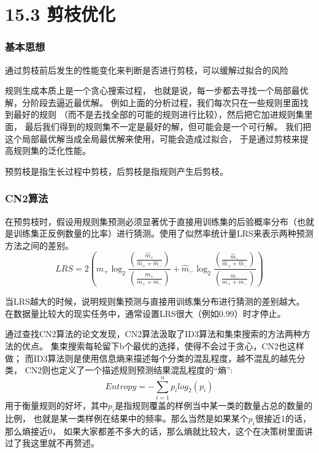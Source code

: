 \documentclass[UTF8]{article}
\begin{document}
\section{15.3 剪枝优化}
\subsubsection{基本思想}
    通过剪枝前后发生的性能变化来判断是否进行剪枝，可以缓解过拟合的风险
    
    规则生成本质上是一个贪心搜索过程，
    也就是说，每一步都去寻找一个局部最优解，分阶段去逼近最优解。
    例如上面的分析过程，我们每次只在一些规则里面找到最好的规则
    （而不是去找全部的可能的规则进行比较），然后把它加进规则集里面，
    最后我们得到的规则集不一定是最好的解，但可能会是一个可行解。
    我们把这个局部最优解当成全局最优解来使用，可能会造成过拟合，
    于是通过剪枝来提高规则集的泛化性能。

    预剪枝是指生长过程中剪枝，后剪枝是指规则产生后剪枝。
\subsubsection{CN2算法}
    在预剪枝时，假设用规则集预测必须显著优于直接用训练集的后验概率分布（也就是训练集正反例数量的比率）进行猜测。使用了似然率统计量LRS来表示两种预测方法之间的差别。
    \begin{equation}
        LRS = 2(\hat{m}_+ \log_2{\frac{(\frac{\hat{m}_+}{\hat{m}_+ + \hat{m}_-})}{(\frac{m_+}{m_+ + m_-})}} + 
        \hat{m}_- \log_2{\frac{(\frac{\hat{m}_-}{\hat{m}_+ + \hat{m}_-})}{(\frac{m_-}{m_+ + m_-})}})
    \end{equation}

    当LRS越大的时候，说明规则集预测与直接用训练集分布进行猜测的差别越大。
    在数据量比较大的现实任务中，通常设置LRS很大（例如0.99）时才停止。
    
    通过查找CN2算法的论文发现，CN2算法汲取了ID3算法和集束搜索的方法两种方法的优点。
    集束搜索每轮留下b个最优的选择，使得不会过于贪心，CN2也这样做；
    而ID3算法则是使用信息熵来描述每个分类的混乱程度，越不混乱的越先分类，
    CN2则也定义了一个描述规则预测结果混乱程度的“熵”:
    \begin{equation}
        Entropy = -\sum_{i=1}^n p_i log_2(p_i)
    \end{equation}
    用于衡量规则的好坏，其中$p_i$是指规则覆盖的样例当中某一类的数量占总的数量的比例，
    也就是某一类样例在结果中的频率。那么当然是如果某个$p_i$很接近1的话，那么熵接近0，
    如果大家都差不多大的话，那么熵就比较大，这个在决策树里面讲过了我这里就不再赘述。
    
\end{document}

